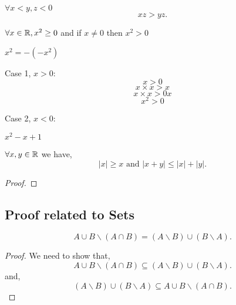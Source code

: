 \begin{theorem}
    $\forall x < y, z < 0$  \[
    xz > yz
    .\] 

    
\end{theorem}

\begin{theorem}
    $\forall x \in \mathbb{R}, x^2 \geq 0$ and if $x \neq 0$ then  $x^2> 0$
\end{theorem}

\begin{theorem}
    $x^2 = - (-x^2)$

    Case 1, $x > 0$: 
    $$x > 0$$
    $$x\times x > x$$
    $$x\times x > 0x$$
    $$ x^2 > 0$$
    
    Case 2, $x < 0$:
\end{theorem}


\begin{eg}
    $x^2 - x + 1$
\end{eg}



\begin{theorem}
    $\forall x,y \in \mathbb{R}$ we have,  \[
        |x| \geq x \text{ and } |x + y| \leq |x| + |y|
    .\] 

    \begin{proof}
        
    \end{proof}
\end{theorem}


\subsection*{Proof related to Sets}
\begin{theorem}
    \[
    A \cup B \backslash (A \cap B) = (A \backslash B) \cup (B \backslash A)
    .\] 

    \begin{proof}
        We need to show that, \[
     A \cup B \backslash (A \cap B) \subseteq  (A \backslash B) \cup (B \backslash A)
        .\] 
        and,
      \[
      (A \backslash B) \cup (B \backslash A) \subseteq A \cup B \backslash (A \cap B) 
      .\] 
    \end{proof}
\end{theorem}



